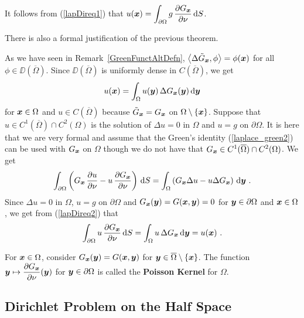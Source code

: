 It follows from (\ref{lapDireq1}) that
$\displaystyle u({\bm{x}}) = \int_{\partial \Omega}
g\,\frac{\partial{G_{{\bm{x}}}}}{\partial \nu} \,\mathrm{d}{S}$.

\begin{rmk}
There is also a formal justification of the previous theorem.

As we have seen in Remark~\ref{GreenFunctAltDefn},
$\displaystyle \left\langle{\Delta \tilde{G}_{{\bm{x}}}} , {\phi}\right\rangle = \phi({\bm{x}})$
for all $\phi \in \DD(\overline{\Omega})$.
Since $\DD(\overline{\Omega})$ is uniformly dense in
$C(\overline{\Omega})$, we get
\begin{equation} \label{lapDireq2}
u({\bm{x}}) = \int_\Omega u({\bm{y}})\,\Delta G_{{\bm{x}}}({\bm{y}})
\,\mathrm{d}{{\bm{y}}}
\end{equation}
for ${\bm{x}} \in \Omega$ and $u \in C(\overline{\Omega})$
because $\tilde{G}_{{\bm{x}}} = G_{{\bm{x}}}$
on $\Omega \setminus \{{\bm{x}}\}$.
Suppose that $u \in C^1(\overline{\Omega}) \cap C^2(\Omega)$ is the
solution of $\Delta u = 0$ in $\Omega$ and $u=g$ on $\partial \Omega$.
It is here that we are very formal and assume that
the Green's identity (\ref{laplace_green2}) can be used with
$G_{{\bm{x}}}$ on $\Omega$ though we do not have that
$G_{{\bm{x}}} \in C^1(\overline{\Omega}) \cap C^2(\Omega)$.
We get
\[
\int_{\partial \Omega} \left( G_{{\bm{x}}}\,\frac{\partial{u}}{\partial \nu} 
- u\,\frac{\partial{G_{{\bm{x}}}}}{\partial \nu} \right) \,\mathrm{d}{S}
= \int_\Omega \left( G_{{\bm{x}}} \Delta u -
u \Delta G_{{\bm{x}}} \right)\,\mathrm{d}{{\bm{y}}} \ .
\]
Since $\Delta u = 0$ in $\Omega$, $u = g$ on $\partial \Omega$ and
$G_{{\bm{x}}}({\bm{y}}) = G({\bm{x}},{\bm{y}}) = 0$ for
${\bm{y}} \in \partial \Omega$ and ${\bm{x}} \in \Omega$,
we get from (\ref{lapDireq2}) that
\[
\int_{\partial \Omega} u\, \pdydx{G_{\VEC{x}}}{\nu} \dx{S}
= \int_\Omega u\, \Delta G_{\VEC{x}} \dx{\VEC{y}} = u(\VEC{x})  \ .
\]
\end{rmk}

\begin{defn}
For ${\bm{x}} \in \Omega$, consider
$\displaystyle G_{{\bm{x}}}({\bm{y}}) = G({\bm{x}},{\bm{y}})$ for
${\bm{y}} \in \overline{\Omega} \setminus \{{\bm{x}}\}$.  The function
$\displaystyle {\bm{y}} \mapsto \frac{\partial{G_{{\bm{x}}}}}{\partial \nu}({\bm{y}})$
for ${\bm{y}}\in \partial \Omega$ is called the
{\bfseries Poisson Kernel} for $\Omega$.
\end{defn}

\subsection{Dirichlet Problem on the Half Space}

